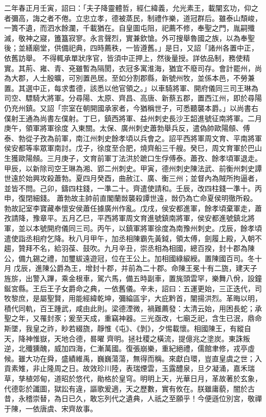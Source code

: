 \begin{pinyinscope}
 二年春正月壬寅，詔曰：「夫子降靈體哲，經仁緯義，允光素王，載闡玄功，仰之者彌高，誨之者不倦。立忠立孝，德被蒸民，制禮作樂，道冠群后。雖泰山頹峻，一簣不遺，而泗水餘瀾，千載猶在。自皇圖屯阻，祀薦不修，奉聖之門，胤嗣殲滅，敬神之寢，簠簋寂寥。永言聲烈，實兼欽愴。外可搜舉魯國之族，以為奉聖後；並繕廟堂，供備祀典，四時薦秩，一皆遵舊。」是日，又詔「諸州各置中正，依舊訪舉。
 不得輒承單狀序官，皆須中正押上，然後量授。詳依品制，務使精實。其荊、雍、青、兗雖暫為隔閡，衣冠多寓淮海，猶宜不廢司存。會計罷州，尚為大郡，人士殷曠，可別置邑居。至如分割郡縣，新號州牧，並係本邑，不勞兼置。其選中正，每求耆德，該悉以他官領之。」以車騎將軍、開府儀同三司王琳為司空、驃騎大將軍。分尋陽、太原、齊昌、高唐、新蔡五郡，置西江州，即於尋陽仍充州鎮。又詔「宗室在朝開國承家者，今猶稱世子，可悉聽襲本爵。」以尚書右僕射王通為尚書左僕射。丁巳，鎮西將軍、益州刺史長沙王韶進號征南將軍。二月庚午，領軍將軍徐度
 入東關。太保、廣州刺史蕭勃舉兵反，遣偽帥歐陽頠、傅泰、勃從子孜為前軍，南江州刺史餘孝頃以兵會之。詔平西將軍周文育、平南將軍侯安都等率眾軍南討。戊子，徐度至合肥，燒齊船三千艘。癸巳，周文育軍於巴山生獲歐陽頠。三月庚子，文育前軍丁法洪於蹠口生俘傅泰。蕭孜、餘孝頃軍退走。甲辰，以新除司空王琳為湘、郢二州刺史。甲寅，德州刺史陳法武、前衡州刺史譚世遠於始興攻殺蕭勃。夏四月癸酉，曲赦江、廣、衡三州；並督內為賊所拘逼者，並皆不問。己卯，鑄四柱錢，一準二十。齊遣使請和。壬辰，改四柱錢一準十。丙申，復閉細錢。
 蕭勃故主帥前直閣蘭敱襲殺譚世遠，敱仍為亡命夏侯明徹所殺。勃故記室李寶藏奉懷安侯蕭任據廣州作亂。戊戌，侯安都進軍，餘孝頃棄軍走，蕭孜請降，豫章平。五月乙巳，平西將軍周文育進號鎮南將軍，侯安都進號鎮北將軍，並以本號開府儀同三司。丙午，以鎮軍將軍徐度為南豫州刺史。戊辰，餘孝頃遣使詣丞相府乞降。秋八月甲午，加丞相陳霸先黃鉞，領太傅，劍履上殿，入朝不趨，贊拜不名，給羽葆、鼓吹。九月辛丑，崇丞相為相國，總百揆，封十郡為陳公，備九錫之禮，加璽紱遠遊冠，位在王公上。加相國綠綟綬。置陳國百司。冬十月
 戊辰，進陳公爵為王，增封十郡，并前為二十郡。命陳王冕十有二旒，建天子旌旂，出警入蹕，乘金根車，駕六馬，備五時副車，置旄頭雲罕，樂舞八佾，設鐘鋋宮縣。王后王子女爵命之典，一依舊儀。辛未，詔曰：五運更始，三正迭代，司牧黎庶，是屬聖賢，用能經緯乾坤，彌綸區宇，大庇黔首，闡揚洪烈。革晦以明，積代同軌，百王踵武，咸由此則。梁德湮微，禍難薦發：太清云始，用困長蛇；承聖之年，又罹封豕；爰至天成，重竊神器。三光亟改，七廟乏祀，含生已泯，鼎命斯墜，我皇之祚，眇若綴旒，靜惟《屯》、《剝》，夕惕載懷。相國陳王，有縱自天，降神惟嶽，天地合德，晷曜
 齊明。拯社稷之橫流，提億兆之塗炭。東誅叛逆，北殲獯醜，威加四海，仁漸萬國。復張崩樂，重紀絕禮，儒館聿修，戎亭虛候。雖大功在舜，盛績維禹，巍巍蕩蕩，無得而稱。來獻白環，豈直皇虞之世；入貢素雉，非止隆周之日。故效珍川陸，表瑞煙雲，玉露醴泉，旦夕凝涌，嘉禾瑞草，孳植郊甸，道昭於悠代，勛格於皇穹。明明上天，光華日月，革故著於玄象，代德彰於讖圖，獄訟有違，謳歌爰適，天之歷數，實有攸在。朕雖庸藐，闇於古昔，永稽崇替，為日已久，敢忘列代之遺典，人祇之至願乎！今便遜位別宮，敬禪于陳，一依唐虞、宋齊故事。




\end{pinyinscope}
